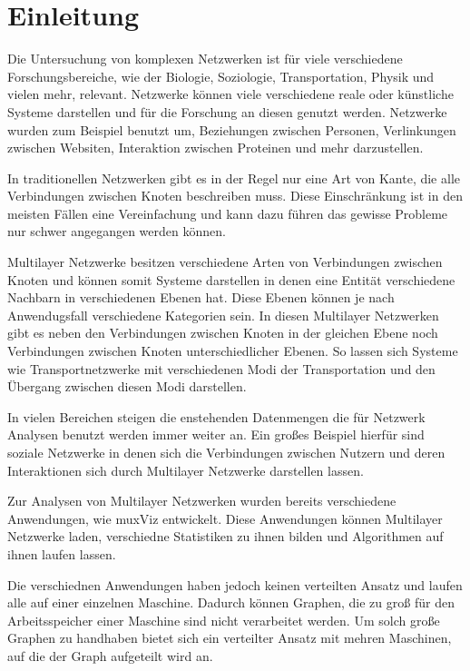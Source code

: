 \chapter{Einleitung}


Die Untersuchung von komplexen Netzwerken ist für viele verschiedene Forschungsbereiche, wie der Biologie, Soziologie, Transportation, Physik und vielen mehr, relevant. 
Netzwerke können viele verschiedene reale oder künstliche Systeme darstellen und für die Forschung an diesen genutzt werden. Netzwerke wurden zum Beispiel benutzt um, Beziehungen zwischen Personen, Verlinkungen zwischen Websiten, Interaktion zwischen Proteinen und mehr darzustellen.

In traditionellen Netzwerken gibt es in der Regel nur eine Art von Kante, die alle Verbindungen zwischen Knoten beschreiben muss.
Diese Einschränkung ist in den meisten Fällen eine Vereinfachung und kann dazu führen das gewisse Probleme nur schwer angegangen werden können. 

Multilayer Netzwerke besitzen verschiedene Arten von Verbindungen zwischen Knoten und können somit Systeme darstellen in denen eine Entität verschiedene Nachbarn in verschiedenen Ebenen hat.
Diese Ebenen können je nach Anwendugsfall verschiedene Kategorien sein. In diesen Multilayer Netzwerken gibt es neben den Verbindungen zwischen Knoten in der gleichen Ebene noch Verbindungen zwischen Knoten unterschiedlicher Ebenen.
So lassen sich Systeme wie Transportnetzwerke mit verschiedenen Modi der Transportation und den Übergang zwischen diesen Modi darstellen.

In vielen Bereichen steigen die enstehenden Datenmengen die für Netzwerk Analysen benutzt werden immer weiter an. Ein großes Beispiel hierfür sind soziale Netzwerke in denen sich die Verbindungen zwischen Nutzern und deren Interaktionen sich durch Multilayer Netzwerke darstellen lassen.


Zur Analysen von Multilayer Netzwerken wurden bereits verschiedene Anwendungen, wie muxViz entwickelt. Diese Anwendungen können Multilayer Netzwerke laden, verschiedne Statistiken zu ihnen bilden und Algorithmen auf ihnen laufen lassen.

Die verschiednen Anwendungen haben jedoch keinen verteilten Ansatz und laufen alle auf einer einzelnen Maschine. Dadurch können Graphen, die zu groß für den Arbeitsspeicher einer Maschine sind nicht verarbeitet werden. 
Um solch große Graphen zu handhaben bietet sich ein verteilter Ansatz mit mehren Maschinen, auf die der Graph aufgeteilt wird an.


